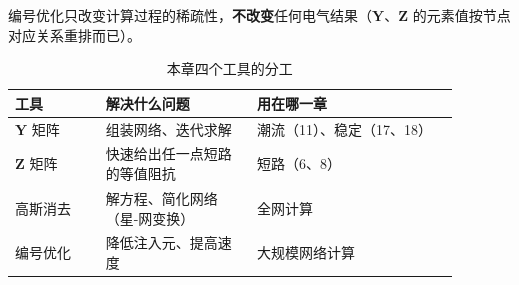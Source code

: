 编号优化只改变计算过程的稀疏性，\textbf{不改变}任何电气结果（$\boldsymbol Y$、$\boldsymbol Z$
的元素值按节点对应关系重排而已）。

\begin{table}[htbp]
  \centering
  \caption{本章四个工具的分工}
  \small
  \begin{tabular}{@{}p{0.18\linewidth}p{0.30\linewidth}p{0.40\linewidth}@{}}
    \toprule
    工具 & 解决什么问题 & 用在哪一章 \\
    \midrule
    $\boldsymbol Y$ 矩阵 & 组装网络、迭代求解 & 潮流（11）、稳定（17、18） \\
    $\boldsymbol Z$ 矩阵 & 快速给出任一点短路的等值阻抗 & 短路（6、8） \\
    高斯消去 & 解方程、简化网络（星-网变换） & 全网计算 \\
    编号优化 & 降低注入元、提高速度 & 大规模网络计算 \\
    \bottomrule
  \end{tabular}
\end{table}

